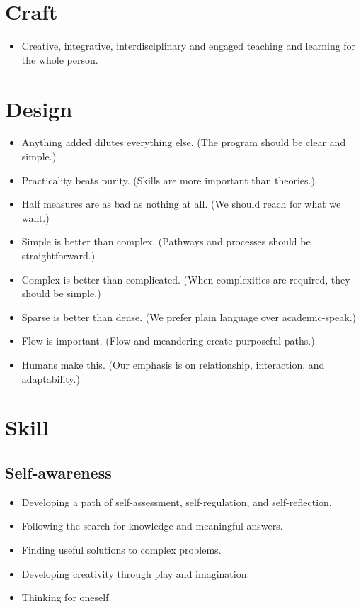 \documentclass[letterpaper,10pt,headsepline]{scrreprt}
\begin{document}
\section{Craft}

\begin{itemize}
\itemsep1pt\parskip0pt
\item
  Creative, integrative, interdisciplinary and engaged teaching and
  learning for the whole person.
\end{itemize}

\section{Design}

\begin{itemize}
\itemsep1pt\parskip0pt
\item
  Anything added dilutes everything else. (The program should be clear
  and simple.)
\item
  Practicality beats purity. (Skills are more important than theories.)
\item
  Half measures are as bad as nothing at all. (We should reach for what
  we want.)
\item
  Simple is better than complex. (Pathways and processes should be
  straightforward.)
\item
  Complex is better than complicated. (When complexities are required,
  they should be simple.)
\item
  Sparse is better than dense. (We prefer plain language over
  academic-speak.)
\item
  Flow is important. (Flow and meandering create purposeful paths.)
\item
  Humans make this. (Our emphasis is on relationship, interaction, and
  adaptability.)
\end{itemize}

\section{Skill}

\subsection{Self-awareness}

\begin{itemize}
\itemsep1pt\parskip0pt
\item
  Developing a path of self-assessment, self-regulation, and
  self-reflection.
\item
  Following the search for knowledge and meaningful answers.
\item
  Finding useful solutions to complex problems.
\item
  Developing creativity through play and imagination.
\item
  Thinking for oneself.
\end{itemize}
\end{document}

